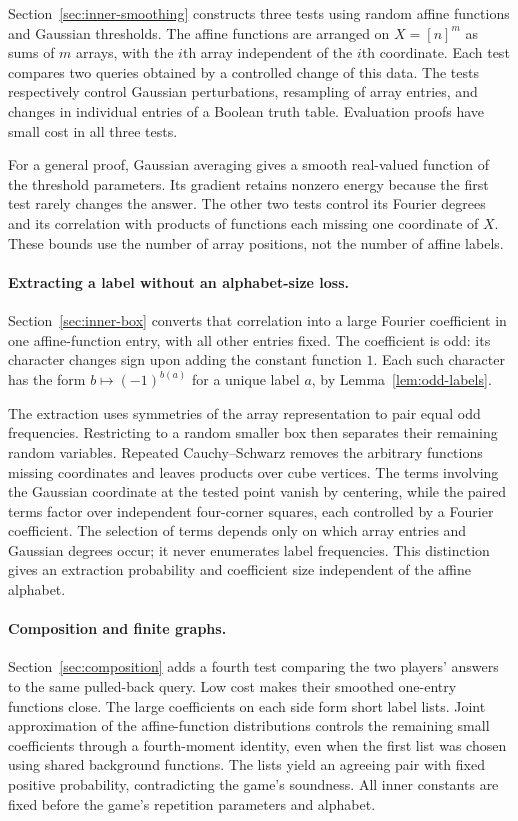 Section~\ref{sec:inner-smoothing} constructs three tests using random affine
functions and Gaussian thresholds. The affine functions are arranged on
$X=[n]^m$ as sums of $m$ arrays, with the $i$th array independent of the
$i$th coordinate. Each test compares two queries obtained by a controlled
change of this data. The tests respectively control Gaussian perturbations,
resampling of array entries, and changes in individual entries of a Boolean
truth table. Evaluation proofs have small cost in all three tests.

For a general proof, Gaussian averaging gives a smooth real-valued function
of the threshold parameters. Its gradient retains nonzero energy because
the first test rarely changes the answer. The other two tests control its
Fourier degrees and its correlation with products of functions each missing
one coordinate of $X$. These bounds use the number of array positions,
not the number of affine labels.

\paragraph{Extracting a label without an alphabet-size loss.}
Section~\ref{sec:inner-box} converts that correlation into a large Fourier
coefficient in one affine-function entry, with all other entries fixed.
The coefficient is odd: its character changes sign upon adding the constant
function $1$. Each such character has the form $b\mapsto(-1)^{b(a)}$ for a unique
label $a$, by Lemma~\ref{lem:odd-labels}.

The extraction uses symmetries of the array representation to pair equal
odd frequencies. Restricting to a random smaller box then separates their
remaining random variables. Repeated Cauchy--Schwarz removes the arbitrary
functions missing coordinates and leaves products over cube vertices.
The terms involving the Gaussian coordinate at the tested point vanish by
centering, while the paired terms factor over independent four-corner
squares, each controlled by a Fourier coefficient. The selection of terms depends only on which
array entries and Gaussian degrees occur; it never enumerates label
frequencies. This distinction gives an extraction probability and
coefficient size independent of the affine alphabet.

\paragraph{Composition and finite graphs.}
Section~\ref{sec:composition} adds a fourth test comparing the two players'
answers to the same pulled-back query. Low cost makes their smoothed
one-entry functions close. The large coefficients on each side form short
label lists. Joint approximation of the affine-function distributions
controls the remaining small coefficients through a fourth-moment
identity, even when the first list was chosen using shared background
functions. The lists yield an agreeing pair with fixed positive probability,
contradicting the game's soundness. All inner constants are fixed before
the game's repetition parameters and alphabet.

